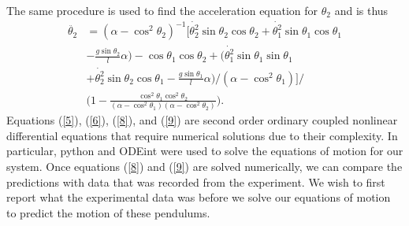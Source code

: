 \documentclass[twocolumn]{article}
\begin{document}
The same procedure is used to find the acceleration equation for $\theta_{2}$ and is thus
\begin{equation}\label{9}
\begin{split}
\ddot{\theta_{2}}&=(\alpha-\cos^2{\theta_2})^{-1}\Bigg[\dot{\theta_{2}^2}\sin{\theta_{2}}\cos{\theta_{2}}+\dot{\theta_{1}^2}\sin{\theta_{1}}\cos{\theta_{1}}\\&
-\frac{g\sin{\theta_{2}}}{l}\alpha)-\cos{\theta_{1}}\cos{\theta_{2}}+\Big(\dot{\theta_{1}^2}\sin{\theta_{1}}\sin{\theta_{1}}\\&
+\dot{\theta_{2}^2}\sin{\theta_{2}}\cos{\theta_{1}}-\frac{g\sin{\theta_{1}}}{l}\alpha\Big)/(\alpha-\cos^2{\theta_1})\Bigg]/ \\&
\Bigg(1-\frac{\cos^2{\theta_{1}}\cos^2{\theta_{2}}}{(\alpha-\cos^2{\theta_1})(\alpha-\cos^2{\theta_2})}\Bigg).
\end{split}
\end{equation}
Equations (\ref{5}), (\ref{6}), (\ref{8}), and (\ref{9}) are second order ordinary coupled nonlinear differential equations that require numerical solutions due to their complexity. In particular, python and ODEint were used to solve the equations of motion for our system. Once equations (\ref{8}) and (\ref{9}) are solved numerically, we can compare the predictions with data that was recorded from the experiment. We wish to first report what the experimental data was before we solve our equations of motion to predict the motion of these pendulums.
\end{document}

